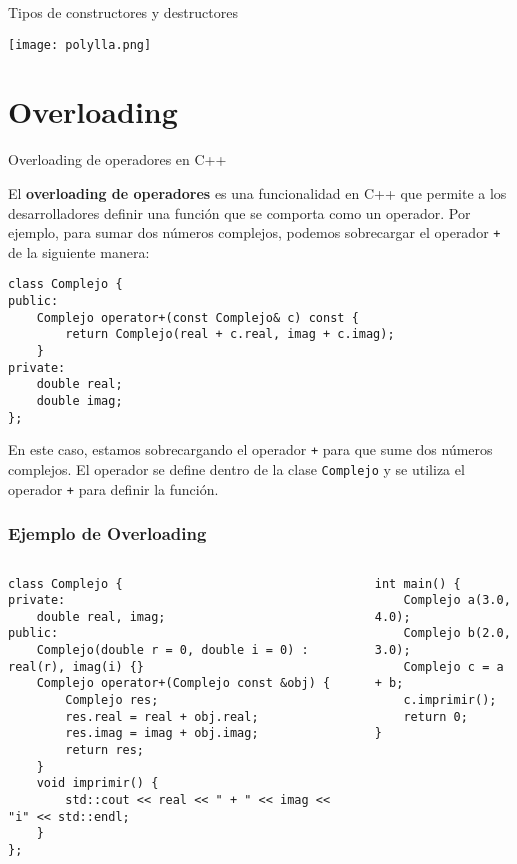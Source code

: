 \documentclass{beamer}
\begin{document}
\begin{frame}{Tipos de constructores y destructores}
    \begin{center}
    \texttt{[image: polylla.png]}
    \end{center}
\end{frame}

\section{Overloading}

\begin{frame}[fragile]{Overloading de operadores en C++}

El \textbf{overloading de operadores} es una funcionalidad en C++ que permite a los desarrolladores definir una función que se comporta como un operador. Por ejemplo, para sumar dos números complejos, podemos sobrecargar el operador \texttt{+} de la siguiente manera:

\begin{verbatim}
class Complejo {
public:
    Complejo operator+(const Complejo& c) const {
        return Complejo(real + c.real, imag + c.imag);
    }
private:
    double real;
    double imag;
};
\end{verbatim}

En este caso, estamos sobrecargando el operador \texttt{+} para que sume dos números complejos. El operador se define dentro de la clase \texttt{Complejo} y se utiliza el operador \texttt{+} para definir la función.
\end{frame}

\begin{frame}[fragile]
\frametitle{Ejemplo de Overloading}

\begin{columns}
    \begin{column}{0.62\textwidth}
        \begin{verbatim}
class Complejo {
private:
    double real, imag;
public:
    Complejo(double r = 0, double i = 0) : real(r), imag(i) {}
    Complejo operator+(Complejo const &obj) {
        Complejo res;
        res.real = real + obj.real;
        res.imag = imag + obj.imag;
        return res;
    }
    void imprimir() {
        std::cout << real << " + " << imag << "i" << std::endl;
    }
};
        \end{verbatim}
    \end{column}

    \begin{column}{0.38\textwidth}
        \begin{verbatim}
int main() {
    Complejo a(3.0, 4.0);
    Complejo b(2.0, 3.0);
    Complejo c = a + b;
    c.imprimir();
    return 0;
}
        \end{verbatim}
    \end{column}
\end{columns}

\end{frame}
\end{document}
